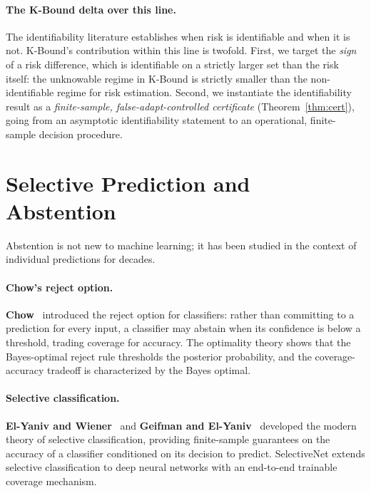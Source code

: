 \paragraph{The K-Bound delta over this line.}
The identifiability literature establishes when risk is identifiable and when
it is not.
K-Bound's contribution within this line is twofold.
First, we target the \emph{sign} of a risk difference, which is identifiable
on a strictly larger set than the risk itself: the unknowable regime in
K-Bound is strictly smaller than the non-identifiable regime for risk
estimation.
Second, we instantiate the identifiability result as a \emph{finite-sample,
false-adapt-controlled certificate} (Theorem~\ref{thm:cert}), going from an
asymptotic identifiability statement to an operational, finite-sample
decision procedure.

\section{Selective Prediction and Abstention}\label{sec:rel-selective}

Abstention is not new to machine learning; it has been studied in the context
of individual predictions for decades.

\paragraph{Chow's reject option.}
\textbf{Chow}~\cite{chow1970optimum} introduced the reject option for
classifiers: rather than committing to a prediction for every input, a
classifier may abstain when its confidence is below a threshold, trading
coverage for accuracy.
The optimality theory shows that the Bayes-optimal reject rule thresholds the
posterior probability, and the coverage-accuracy tradeoff is characterized by
the Bayes optimal.

\paragraph{Selective classification.}
\textbf{El-Yaniv and Wiener}~\cite{elyaniv2010selective} and
\textbf{Geifman and El-Yaniv}~\cite{geifman2017selective} developed the
modern theory of selective classification, providing finite-sample guarantees
on the accuracy of a classifier conditioned on its decision to predict.
SelectiveNet extends selective classification to deep neural networks with
an end-to-end trainable coverage mechanism.

